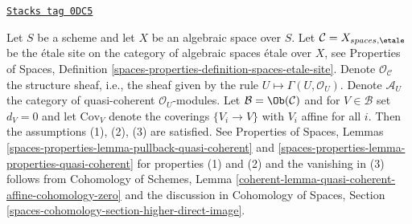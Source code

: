 \begin{example}
\label{spaces-simplicial-example-quasi-coherent-spaces-etale}
\href{https://stacks.math.columbia.edu/tag/0DC5}{\texttt{Stacks tag 0DC5}}

Let $S$ be a scheme and let $X$ be an algebraic space over $S$.
Let $\mathcal{C} = X_{spaces, \etale}$ be the \'etale site
on the category of algebraic spaces \'etale over $X$, see
Properties of Spaces, Definition
\ref{spaces-properties-definition-spaces-etale-site}.
Denote $\mathcal{O}_\mathcal{C}$ the structure sheaf, i.e., the
sheaf given by the rule $U \mapsto \Gamma(U, \mathcal{O}_U)$.
Denote $\mathcal{A}_U$ the category of quasi-coherent $\mathcal{O}_U$-modules.
Let $\mathcal{B} = \Ob(\mathcal{C})$ and for $V \in \mathcal{B}$
set $d_V = 0$ and let $\text{Cov}_V$ denote
the coverings $\{V_i \to V\}$ with $V_i$ affine for all $i$.
Then the assumptions (1), (2), (3) are satisfied.
See Properties of Spaces, Lemmas
\ref{spaces-properties-lemma-pullback-quasi-coherent} and
\ref{spaces-properties-lemma-properties-quasi-coherent}
for properties (1) and (2) and the vanishing in (3) follows from
Cohomology of Schemes, Lemma
\ref{coherent-lemma-quasi-coherent-affine-cohomology-zero}
and the discussion in Cohomology of Spaces, Section
\ref{spaces-cohomology-section-higher-direct-image}.
\end{example}

